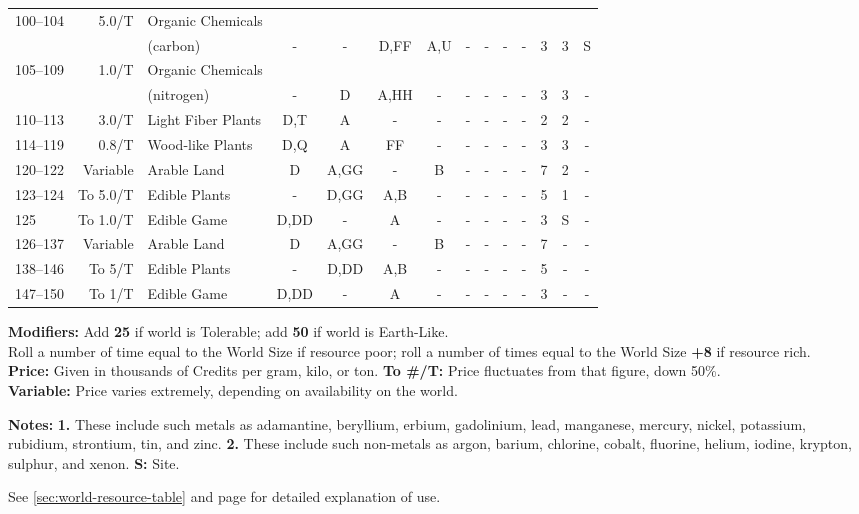 \begin{table}[htbp]
{\begin{minipage}{0.93\textwidth}
\begin{tabular}{lrlccccccccccc}
\rowcolor{grey}
100--104 & 5.0/T & Organic Chemicals &&&&&&&&&&&\\
\rowcolor{grey}
& & (carbon) & - & - & D,FF & A,U & - & - & - & - & 3 & 3 & S\\
105--109 & 1.0/T & Organic Chemicals &&&&&&&&&&&\\
& & (nitrogen) & - & D & A,HH & - & - & - & - & - & 3 & 3 & -\\
\rowcolor{grey}
110--113 & 3.0/T & Light Fiber Plants & D,T & A & - & - & - & - & - & - & 2 & 2 & -\\
114--119 & 0.8/T & Wood-like Plants & D,Q & A & FF & - & - & - & - & - & 3 & 3 & -\\
\rowcolor{grey}
120--122 & Variable & Arable Land & D & A,GG & - & B & - & - & - & - & 7 & 2 & -\\
123--124 & To 5.0/T & Edible Plants & - & D,GG & A,B & - & - & - & - & - & 5 & 1 & -\\
\rowcolor{grey}
125 & To 1.0/T & Edible Game & D,DD & - & A & - & - & - & - & - & 3 & S & -\\
126--137 & Variable & Arable Land & D & A,GG & - & B & - & - & - & - & 7 & - & -\\
\rowcolor{grey}
138--146 & To 5/T & Edible Plants & - & D,DD & A,B & - & - & - & - & - & 5 & - & -\\
147--150 & To 1/T & Edible Game & D,DD & - & A & - & - & - & - & - & 3 & - & - 
      \end{tabular}

      \medskip

      \parbox{\textwidth}{\textbf{Modifiers:} Add \textbf{25} if world
        is Tolerable; add \textbf{50} if world is Earth-Like.\\ 
        Roll a number of time equal to the World Size if resource
        poor; roll a number of times equal to the World Size
        \textbf{+8} if resource rich.\\
        \textbf{Price:} Given in thousands of Credits per gram, kilo,
        or ton. \textbf{To \#/T:} Price fluctuates from that figure,
        down 50\%.\\
        \textbf{Variable:} Price varies extremely, depending on
        availability on the world.
        
        \textbf{Notes:} \textbf{1.} These include such metals as
        adamantine, beryllium, erbium, gadolinium, lead, manganese,
        mercury, nickel, potassium, rubidium, strontium, tin, and
        zinc. \textbf{2.} These include such non-metals as argon,
        barium, chlorine, cobalt, fluorine, helium, iodine, krypton,
        sulphur, and xenon. \textbf{S:} Site.

        See \ref{sec:world-resource-table} and page
        \pageref{tab:world-resource-explanation} for detailed
        explanation of use.}
    \end{minipage}}
\end{table}

